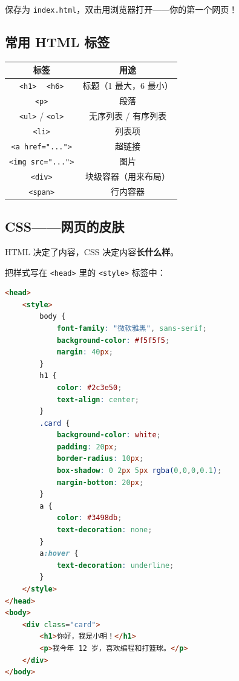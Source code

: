 \documentclass[a4paper,12pt]{ctexart}
\begin{document}
保存为 \texttt{index.html}，双击用浏览器打开——你的第一个网页！

\subsection*{常用 HTML 标签}

\begin{center}
\begin{tabular}{|c|c|}
\hline
\textbf{标签} & \textbf{用途} \\ \hline
\texttt{<h1>} ~ \texttt{<h6>} & 标题（1 最大，6 最小） \\ \hline
\texttt{<p>} & 段落 \\ \hline
\texttt{<ul>} / \texttt{<ol>} & 无序列表 / 有序列表 \\ \hline
\texttt{<li>} & 列表项 \\ \hline
\texttt{<a href="...">} & 超链接 \\ \hline
\texttt{<img src="...">} & 图片 \\ \hline
\texttt{<div>} & 块级容器（用来布局） \\ \hline
\texttt{<span>} & 行内容器 \\ \hline
\end{tabular}
\end{center}

\subsection*{CSS——网页的皮肤}

HTML 决定了内容，CSS 决定内容\textbf{长什么样}。

把样式写在 \texttt{<head>} 里的 \texttt{<style>} 标签中：

\begin{lstlisting}[language=HTML]
<head>
    <style>
        body {
            font-family: "微软雅黑", sans-serif;
            background-color: #f5f5f5;
            margin: 40px;
        }
        h1 {
            color: #2c3e50;
            text-align: center;
        }
        .card {
            background-color: white;
            padding: 20px;
            border-radius: 10px;
            box-shadow: 0 2px 5px rgba(0,0,0,0.1);
            margin-bottom: 20px;
        }
        a {
            color: #3498db;
            text-decoration: none;
        }
        a:hover {
            text-decoration: underline;
        }
    </style>
</head>
<body>
    <div class="card">
        <h1>你好，我是小明！</h1>
        <p>我今年 12 岁，喜欢编程和打篮球。</p>
    </div>
</body>
\end{lstlisting}
\end{document}
